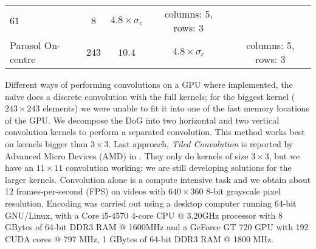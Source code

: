 \begin{table}[htb]
\begin{tabular}{l c c c c}
    \begin{minipage}{1cm}\centering $61$ \end{minipage}& 
    $8$ & $4.8 \times \sigma_c$ & 
    \begin{minipage}{1.4cm} columns: 5, rows: 3 \end{minipage}\\
    \begin{minipage}{1.2cm} Parasol On-centre \vspace*{0.005cm}\end{minipage} & 
    \begin{minipage}{1cm}\centering $243$\end{minipage} &
    $10.4$ & $4.8 \times \sigma_c$ & 
    \begin{minipage}{1.4cm} columns: 5, rows: 3 \end{minipage}
  \end{tabular}
  \label{tab-kernel-specs}
\end{table}
Different ways of performing convolutions on a GPU where implemented, the naïve
does a discrete convolution with the full kernels; for the biggest kernel 
($243\times243$ elements) we were unable to fit it into one of the fast memory
locations of the GPU. We decompose the DoG into two horizontal and two vertical
convolution kernels to perform a separated convolution. This method works best 
on kernels bigger than $3\times3$. Last approach, \emph{Tiled Convolution} is 
reported by Advanced Micro Devices (AMD) in \cite{tiled-convolution}. They only 
do kernels of size $3\times3$, but we have an $11\times11$ convolution working; 
we are still developing solutions for the larger kernels.
Convolution alone is a compute intensive task and we 
obtain about 12 frames-per-second (FPS) on videos with $640\times360$ 8-bit 
grayscale pixel resolution. Encoding was carried out using a desktop computer 
running 64-bit GNU/Linux, with a Core i5-4570 4-core CPU @ 3.20GHz processor 
with 8 GBytes of 64-bit DDR3 RAM @ 1600MHz and a GeForce GT 720 GPU with 192 
CUDA cores @ 797 MHz, 1 GBytes of 64-bit DDR3 RAM @ 1800 MHz. %

